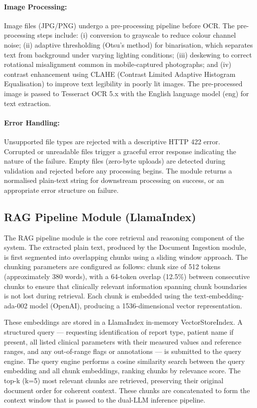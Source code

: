 \paragraph{Image Processing:}
Image files (JPG/PNG) undergo a pre-processing pipeline before OCR. The pre-processing steps include: (i) conversion to grayscale to reduce colour channel noise; (ii) adaptive thresholding (Otsu's method) for binarisation, which separates text from background under varying lighting conditions; (iii) deskewing to correct rotational misalignment common in mobile-captured photographs; and (iv) contrast enhancement using CLAHE (Contrast Limited Adaptive Histogram Equalisation) to improve text legibility in poorly lit images. The pre-processed image is passed to Tesseract OCR 5.x with the English language model (eng) for text extraction.

\paragraph{Error Handling:}
Unsupported file types are rejected with a descriptive HTTP 422 error. Corrupted or unreadable files trigger a graceful error response indicating the nature of the failure. Empty files (zero-byte uploads) are detected during validation and rejected before any processing begins. The module returns a normalised plain-text string for downstream processing on success, or an appropriate error structure on failure.

\subsection{RAG Pipeline Module (LlamaIndex)}
The RAG pipeline module is the core retrieval and reasoning component of the system. The extracted plain text, produced by the Document Ingestion module, is first segmented into overlapping chunks using a sliding window approach. The chunking parameters are configured as follows: chunk size of 512 tokens (approximately 380 words), with a 64-token overlap (12.5\%) between consecutive chunks to ensure that clinically relevant information spanning chunk boundaries is not lost during retrieval. Each chunk is embedded using the text-embedding-ada-002 model (OpenAI), producing a 1536-dimensional vector representation.

These embeddings are stored in a LlamaIndex in-memory VectorStoreIndex. A structured query --- requesting identification of report type, patient name if present, all listed clinical parameters with their measured values and reference ranges, and any out-of-range flags or annotations --- is submitted to the query engine. The query engine performs a cosine similarity search between the query embedding and all chunk embeddings, ranking chunks by relevance score. The top-k (k=5) most relevant chunks are retrieved, preserving their original document order for coherent context. These chunks are concatenated to form the context window that is passed to the dual-LLM inference pipeline.

